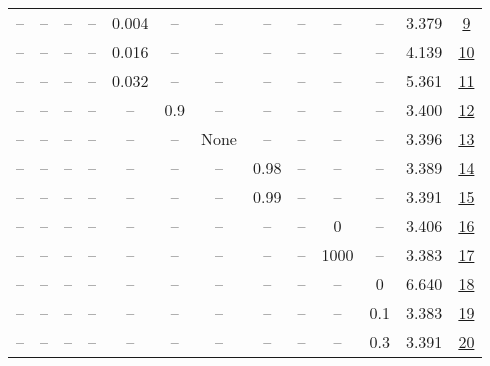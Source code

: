 \begin{table}[H]
\begin{tabular}{ccccccccccccc}
-- & -- & -- & -- & 0.004 & -- & -- & -- & -- & -- & -- & 3.379 & \href{https://wandb.ai/stanford-mercury/optimizer-scaling/runs/sweep-130m-5B-mudamhf5aa1clr0.004-alr0.008-wd0.2-minlr0-warmup50-3f0db1}{9} \\
-- & -- & -- & -- & 0.016 & -- & -- & -- & -- & -- & -- & 4.139 & \href{https://wandb.ai/stanford-mercury/optimizer-scaling/runs/sweep-130m-5B-mudamxd71e9blr0.016-alr0.008-wd0.2-minlr0-warmup50-941b3c}{10} \\
-- & -- & -- & -- & 0.032 & -- & -- & -- & -- & -- & -- & 5.361 & \href{https://wandb.ai/stanford-mercury/optimizer-scaling/runs/sweep-130m-5B-mudamh671c15lr0.032-alr0.008-wd0.2-minlr0-warmup50-1b93b8}{11} \\
-- & -- & -- & -- & -- & 0.9 & -- & -- & -- & -- & -- & 3.400 & \href{https://wandb.ai/stanford-mercury/optimizer-scaling/runs/sweep-130m-5B-mudamhec585dlr0.008-alr0.008-wd0.2-minlr0-warmup50-8915fe}{12} \\
-- & -- & -- & -- & -- & -- & None & -- & -- & -- & -- & 3.396 & \href{https://wandb.ai/stanford-mercury/optimizer-scaling/runs/sweep-130m-5B-mudamhfba204lr0.008-alr0.008-wd0.2-minlr0-warmup50-229ac2}{13} \\
-- & -- & -- & -- & -- & -- & -- & 0.98 & -- & -- & -- & 3.389 & \href{https://wandb.ai/stanford-mercury/optimizer-scaling/runs/sweep-130m-5B-mudamh0a566blr0.008-alr0.008-wd0.2-minlr0-warmup50-b33e5a}{14} \\
-- & -- & -- & -- & -- & -- & -- & 0.99 & -- & -- & -- & 3.391 & \href{https://wandb.ai/stanford-mercury/optimizer-scaling/runs/sweep-130m-5B-mudamhdcc541lr0.008-alr0.008-wd0.2-minlr0-warmup50-600a54}{15} \\
-- & -- & -- & -- & -- & -- & -- & -- & -- & 0 & -- & 3.406 & \href{https://wandb.ai/stanford-mercury/optimizer-scaling/runs/sweep-130m-5B-mudamx992d71lr0.008-alr0.008-wd0.2-minlr0-warmup0--2176f5}{16} \\
-- & -- & -- & -- & -- & -- & -- & -- & -- & 1000 & -- & 3.383 & \href{https://wandb.ai/stanford-mercury/optimizer-scaling/runs/sweep-130m-5B-mudamh12b39elr0.008-alr0.008-wd0.2-minlr0-warmup10-bc64dc}{17} \\
-- & -- & -- & -- & -- & -- & -- & -- & -- & -- & 0 & 6.640 & \href{https://wandb.ai/stanford-mercury/optimizer-scaling/runs/sweep-130m-5B-mudamhb0494elr0.008-alr0.008-wd0-minlr0-warmup500--7d74c8}{18} \\
-- & -- & -- & -- & -- & -- & -- & -- & -- & -- & 0.1 & 3.383 & \href{https://wandb.ai/stanford-mercury/optimizer-scaling/runs/sweep-130m-5B-mudamhab74f2lr0.008-alr0.008-wd0.1-minlr0-warmup50-0efdac}{19} \\
-- & -- & -- & -- & -- & -- & -- & -- & -- & -- & 0.3 & 3.391 & \href{https://wandb.ai/stanford-mercury/optimizer-scaling/runs/sweep-130m-5B-mudamhfa2f5clr0.008-alr0.008-wd0.3-minlr0-warmup50-8632db}{20} \\
\bottomrule
\end{tabular}
\end{table}

